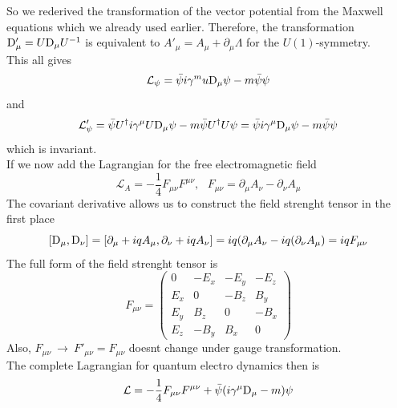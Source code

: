 \documentclass{include/thesisclass}
\newcommand{\LL}{\mathcal{L}}
\newcommand{\Dd}{{\rm D}}
\newcommand{\df}{\rightarrow}
\newcommand{\p}{\partial}
\begin{document}
So we rederived the transformation of the vector potential from the Maxwell equations which we already used earlier. Therefore, the transformation $\Dd'_\mu = U \Dd_\mu U^{-1}$ is equivalent to $A'_\mu = A_\mu + \p_\mu \Lambda$ for the $U(1)$-symmetry.\\
This all gives
\[ \LL_\psi = \bar{\psi} i \gamma^mu \Dd_\mu \psi - m \bar{\psi}\psi\]
and
\[ \LL'_\psi = \bar{\psi} U^\dagger i \gamma^\mu U \Dd_\mu \psi - m \bar{\psi}U^\dagger U \psi = \bar{\psi}i \gamma^\mu \Dd_\mu \psi - m \bar{\psi}\psi\]
which is invariant.\\
If we now add the Lagrangian for the free electromagnetic field
\[ \LL_A = - \frac{1}{4} F_{\mu \nu} F^{\mu \nu}, ~~~ F_{\mu \nu} = \p_\mu A_\nu - \p_\nu A_\mu\]
The covariant derivative allows us to construct the field strenght tensor in the first place
\[ [\Dd_\mu, \Dd_\nu] = [ \p_\mu + i q A_\mu, \p_\nu + i q A_\nu] = i q ( \p_\mu A_\nu - iq ( \p_\nu A_\mu) = iq F_{\mu\nu}\]
The full form of the field strenght tensor is
\[ F_{\mu\nu} = \begin{pmatrix} 0 & -E_x & - E_y & -E_z \\
E_x & 0 & - B_z & B_y \\
E_y & B_z & 0 & - B_x \\
E_z & -B_y & B_x & 0 \end{pmatrix}\]
Also, $F_{\mu\nu} ~\df~F'_{\mu\nu} = F_{\mu\nu}$ doesnt change under gauge transformation.\\
The complete Lagrangian for quantum electro dynamics then is
\[\LL = -\frac{1}{4} F_{\mu\nu}F^{\mu\nu} + \bar{\psi} ( i \gamma^\mu \Dd_\mu - m )\psi\]
\end{document}
